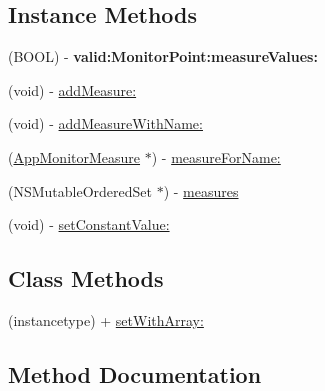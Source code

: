 \subsection*{Instance Methods}
\begin{DoxyCompactItemize}
\item 
\mbox{\label{interface_app_monitor_measure_set_ae97c6d55bc329ce233358aab3c16c01a}} 
(B\+O\+OL) -\/ {\bfseries valid\+:\+Monitor\+Point\+:measure\+Values\+:}
\item 
(void) -\/ \mbox{\hyperlink{interface_app_monitor_measure_set_aa298147b064981faaa09cc60ae3cd72d}{add\+Measure\+:}}
\item 
(void) -\/ \mbox{\hyperlink{interface_app_monitor_measure_set_abca2f2157a4a76f42617bc9b043b6b06}{add\+Measure\+With\+Name\+:}}
\item 
(\mbox{\hyperlink{interface_app_monitor_measure}{App\+Monitor\+Measure}} $\ast$) -\/ \mbox{\hyperlink{interface_app_monitor_measure_set_a000f95b993f767c95c15fab2d878c868}{measure\+For\+Name\+:}}
\item 
(N\+S\+Mutable\+Ordered\+Set $\ast$) -\/ \mbox{\hyperlink{interface_app_monitor_measure_set_a5a5ba0cebd83395a1b1ba9f66c868c21}{measures}}
\item 
(void) -\/ \mbox{\hyperlink{interface_app_monitor_measure_set_a94e92d1fb4d82c1a32c59f4321945216}{set\+Constant\+Value\+:}}
\end{DoxyCompactItemize}
\subsection*{Class Methods}
\begin{DoxyCompactItemize}
\item 
(instancetype) + \mbox{\hyperlink{interface_app_monitor_measure_set_af18795825db602c3c568839f8cbc6028}{set\+With\+Array\+:}}
\end{DoxyCompactItemize}


\subsection{Method Documentation}
\mbox{\label{interface_app_monitor_measure_set_aa298147b064981faaa09cc60ae3cd72d}} 
